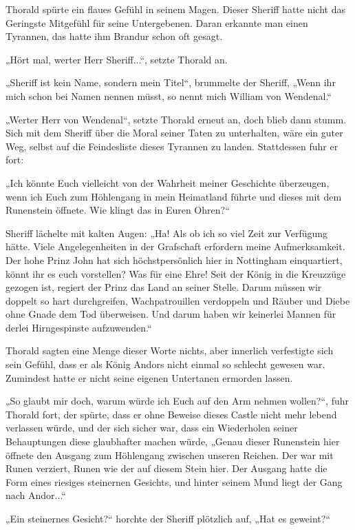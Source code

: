 Thorald spürte ein flaues Gefühl in seinem Magen. Dieser Sheriff hatte nicht das Geringste Mitgefühl für seine Untergebenen. Daran erkannte man einen Tyrannen, das hatte ihm Brandur schon oft gesagt.

„Hört mal, werter Herr Sheriff...“, setzte Thorald an.

„Sheriff ist kein Name, sondern mein Titel“, brummelte der Sheriff, „Wenn ihr mich schon bei Namen nennen müsst, so nennt mich William von Wendenal.“

„Werter Herr von Wendenal“, setzte Thorald erneut an, doch blieb dann stumm. Sich mit dem Sheriff über die Moral seiner Taten zu unterhalten, wäre ein guter Weg, selbst auf die Feindesliste dieses Tyrannen zu landen. Stattdessen fuhr er fort:

„Ich könnte Euch vielleicht von der Wahrheit meiner Geschichte überzeugen, wenn ich Euch zum Höhlengang in mein Heimatland führte und dieses mit dem Runenstein öffnete. Wie klingt das in Euren Ohren?“

Sheriff lächelte mit kalten Augen: „Ha! Als ob ich so viel Zeit zur Verfügung hätte. Viele Angelegenheiten in der Grafschaft erfordern meine Aufmerksamkeit. Der hohe Prinz John hat sich höchstpersönlich hier in Nottingham einquartiert, könnt ihr es euch vorstellen? Was für eine Ehre! Seit der König in die Kreuzzüge gezogen ist, regiert der Prinz das Land an seiner Stelle. Darum müssen wir doppelt so hart durchgreifen, Wachpatrouillen verdoppeln und Räuber und Diebe ohne Gnade dem Tod überweisen. Und darum haben wir keinerlei Mannen für derlei Hirngespinste aufzuwenden.“

Thorald sagten eine Menge dieser Worte nichts, aber innerlich verfestigte sich sein Gefühl, dass er als König Andors nicht einmal so schlecht gewesen war. Zumindest hatte er nicht seine eigenen Untertanen ermorden lassen.

„So glaubt mir doch, warum würde ich Euch auf den Arm nehmen wollen?“, fuhr Thorald fort, der spürte, dass er ohne Beweise dieses Castle nicht mehr lebend verlassen würde, und der sich sicher war, dass ein Wiederholen seiner Behauptungen diese glaubhafter machen würde, „Genau dieser Runenstein hier öffnete den Ausgang zum Höhlengang zwischen unseren Reichen. Der war mit Runen verziert, Runen wie der auf diesem Stein hier. Der Ausgang hatte die Form eines riesiges steinernen Gesichts, und hinter seinem Mund liegt der Gang nach Andor...“

„Ein steinernes Gesicht?“ horchte der Sheriff plötzlich auf, „Hat es geweint?“

